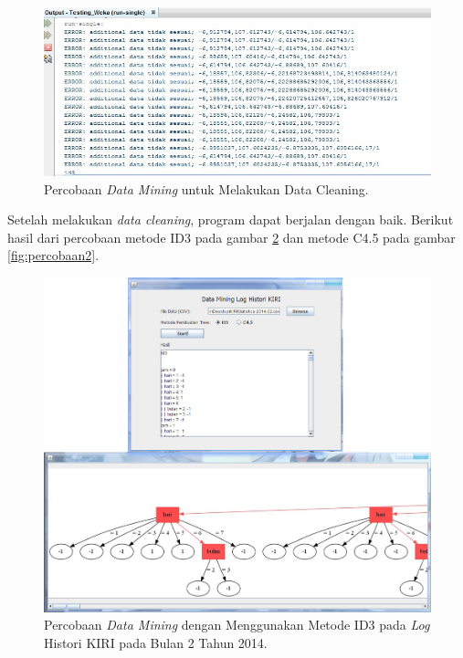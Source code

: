 \begin{figure}[H]
\centering
\includegraphics[scale=0.5]{Gambar/percobaanError.jpg}
\caption[Percobaan \textsl{Data Mining} untuk Melakukan Data Cleaning]{Percobaan \textsl{Data Mining} untuk Melakukan Data Cleaning.} 
\label{fig:percobaanError}
\end{figure}

Setelah melakukan \textsl{data cleaning}, program dapat berjalan dengan baik. Berikut hasil dari percobaan metode ID3 pada gambar \ref{fig:percobaan1} dan metode C4.5 pada gambar \ref{fig:percobaan2}.

\begin{figure}[H]
\centering
\includegraphics[scale=0.43]{Gambar/percobaan1.jpg}
\caption[Percobaan \textsl{Data Mining} dengan Menggunakan Metode ID3 pada \textsl{Log} Histori KIRI pada Bulan 2 Tahun 2014]{Percobaan \textsl{Data Mining} dengan Menggunakan Metode ID3 pada \textsl{Log} Histori KIRI pada Bulan 2 Tahun 2014.} 
\label{fig:percobaan1}
\end{figure}

